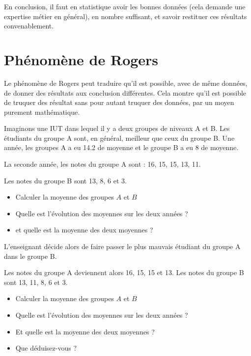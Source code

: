 \documentclass[10pt, a4paper]{article}
\begin{document}
En conclusion, il faut en statistique avoir les bonnes données
(cela demande une expertise métier en général), en nombre suffisant, et savoir restituer ces résultats convenablement.
\newpage
\section{Phénomène de Rogers}

Le phénomène de Rogers peut traduire qu’il est possible, avec de même données, de donner des résultats aux conclusion différentes. Cela montre qu’il est possible de truquer des résultat sans pour autant truquer des données,
par un moyen purement mathématique. 


\begin{tcolorbox}[lefttitle=1cm, colframe=gray!75!black, colback=white, title=\textbf{EXERCICE 8}]


Imaginons une IUT dans lequel il y a deux groupes de niveaux A et B. Les
étudiants du groupe A sont, en général, meilleur que ceux du groupe B. Une année, les groupes A a eu 14.2 de moyenne et le groupe B a eu 8 de moyenne.

La seconde année, les notes du groupe A sont : 16, 15, 15, 13, 11. 

Les notes du groupe B sont 13, 8, 6 et 3. 


\begin{tcolorbox}[lefttitle=1cm, colframe=gray!75!black, colback=white, title=\textbf{EXERCICE 8.1}]

\begin{itemize}
    \item Calculer la moyenne des groupes $A$ et $B$ 
    \item Quelle est l'évolution des moyennes sur les deux années ? 
    \item et quelle est la moyenne des deux moyennes ? 
\end{itemize}
\vspace{1cm}
\end{tcolorbox}

L’enseignant décide alors de faire passer le plus mauvais étudiant du groupe A dans le groupe B.

\begin{tcolorbox}[lefttitle=1cm, colframe=gray!75!black, colback=white, title=\textbf{EXERCICE 8.2}]


Les notes du groupe A deviennent alors 16, 15, 15 et 13.
Les notes du groupe B sont 13, 11, 8, 6 et 3. 
\begin{itemize}
    \item Calculer la moyenne des groupes $A$ et $B$ 
    \item Quelle est l'évolution des moyennes sur les deux années ?
    \item Et quelle est la moyenne des deux moyennes ?  
    \item Que déduisez-vous ?
\end{itemize}
\vspace{3cm}

\end{tcolorbox}

\end{tcolorbox}
\end{document}
